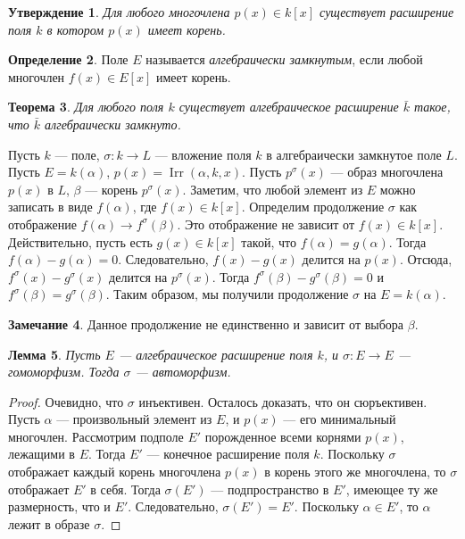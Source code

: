\documentclass[12pt, titlepage, oneside]{amsbook}
\newcommand{\Irr}{\operatorname{Irr}}
\newtheorem{theorem}{Теорема}[chapter]
\newtheorem{lemma}[theorem]{Лемма}
\newtheorem{claim}[theorem]{Утверждение}
\theoremstyle{definition}
\newtheorem{definition}[theorem]{Определение}
\newtheorem{remark}[theorem]{Замечание}
\theoremstyle{remark}
\begin{document}
 \begin{claim}
\label{Nor1}
Для любого многочлена $p(x)\in k[x]$ существует расширение поля $k$ в котором $p(x)$ имеет корень.
\end{claim}

\begin{definition}
Поле $E$ называется \emph{алгебраически замкнутым}, если любой многочлен $f(x)\in E[x]$ имеет корень.
\end{definition}

\begin{theorem}
\label{Zam}
Для любого поля $k$ существует алгебраическое расширение $\bar{k}$ такое, что $\bar{k}$ алгебраически замкнуто.
\end{theorem}

Пусть $k$ --- поле, $\sigma\colon k\rightarrow L$ --- вложение поля $k$ в алгебраически замкнутое поле $L$. Пусть $E=k(\alpha)$, $p(x)=\Irr(\alpha,k,x)$. Пусть $p^{\sigma}(x)$ --- образ многочлена $p(x)$ в $L$, $\beta$ --- корень $p^{\sigma}(x)$. Заметим, что любой элемент из $E$ можно записать в виде $f(\alpha)$, где $f(x)\in k[x]$. Определим продолжение $\sigma$ как отображение $f(\alpha)\rightarrow f^{\sigma}(\beta)$. Это отображение не зависит от $f(x)\in k[x]$. Действительно, пусть есть $g(x)\in k[x]$ такой, что $f(\alpha)=g(\alpha)$. Тогда $f(\alpha)-g(\alpha)=0$. Следовательно, $f(x)-g(x)$ делится на $p(x)$. Отсюда, $f^{\sigma}(x)-g^{\sigma}(x)$ делится на $p^{\sigma}(x)$. Тогда $f^{\sigma}(\beta)-g^{\sigma}(\beta)=0$ и $f^{\sigma}(\beta)=g^{\sigma}(\beta)$. Таким образом, мы получили продолжение $\sigma$ на $E=k(\alpha)$.

\begin{remark}
Данное продолжение не единственно и зависит от выбора $\beta$.
\end{remark}

\begin{lemma}
\label{Lem1}
Пусть $E$ --- алгебраическое расширение поля $k$, и $\sigma\colon E\rightarrow E$ --- гомоморфизм. Тогда $\sigma$ --- автоморфизм.
\end{lemma}

\begin{proof}
Очевидно, что $\sigma$ инъективен. Осталось доказать, что он сюръективен. Пусть $\alpha$ --- произвольный элемент из $E$, и $p(x)$ --- его минимальный многочлен. Рассмотрим подполе $E'$ порожденное всеми корнями $p(x)$, лежащими в $E$. Тогда $E'$ --- конечное расширение поля $k$. Поскольку $\sigma$ отображает каждый корень многочлена $p(x)$ в корень этого же многочлена, то $\sigma$ отображает $E'$ в себя. Тогда $\sigma(E')$ --- подпространство в $E'$, имеющее ту же размерность, что и $E'$. Следовательно, $\sigma(E')=E'$. Поскольку $\alpha\in E'$, то $\alpha$ лежит в образе $\sigma$.
\end{proof}
\end{document}

